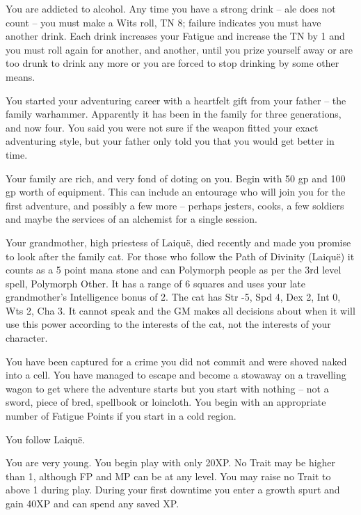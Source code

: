 \begin{multicols}{2}
\begin{list}{\addtocounter{list}{1}\textbf{:}}{\raggedleft}
  \item
  You are addicted to alcohol.
  Any time you have a strong drink -- ale does not count -- you must make a Wits roll, TN 8; failure indicates you must have another drink.
  Each drink increases your Fatigue and increase the TN by 1 and you must roll again for another, and another, until you prize yourself away or are too drunk to drink any more or you are forced to stop drinking by some other means.

  \item
  You started your adventuring career with a heartfelt gift from your father -- the family warhammer.
  Apparently it has been in the family for three generations, and now four.
  You said you were not sure if the weapon fitted your exact adventuring style, but your father only told you that you would get better in time.

  \item
  Your family are rich, and very fond of doting on you.
  Begin with 50 gp and 100 gp worth of equipment.
  This can include an entourage who will join you for the first adventure, and possibly a few more -- perhaps jesters, cooks, a few soldiers and maybe the services of an alchemist for a single session.

  \item
  Your grandmother, high priestess of Laiqu\"{e}, died recently and made you promise to look after the family cat.
  For those who follow the Path of Divinity (Laiqu\"{e}) it counts as a 5 point mana stone and can Polymorph people as per the 3rd level spell, Polymorph Other.
  It has a range of 6 squares and uses your late grandmother's Intelligence bonus of 2.
  The cat has Str -5, Spd 4, Dex 2, Int 0, Wts 2, Cha 3.
  It cannot speak and the GM makes all decisions about when it will use this power according to the interests of the cat, not the interests of your character.

  \item
  You have been captured for a crime you did not commit and were shoved naked into a cell.
  You have managed to escape and become a stowaway on a travelling wagon to get where the adventure starts but you start with nothing -- not a sword, piece of bred, spellbook or loincloth.
  You begin with an appropriate number of Fatigue Points if you start in a cold region.

  You follow Laiqu\"e.

  \item
  You are very young.
  You begin play with only 20XP.
  No Trait may be higher than 1, although FP and MP can be at any level.
  You may raise no Trait to above 1 during play.
  During your first downtime you enter a growth spurt and gain 40XP and can spend any saved XP.


\end{list}
\end{multicols}
